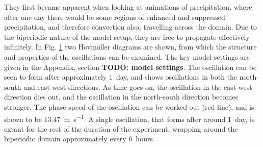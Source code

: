 \documentclass[11pt,a4paper]{article}
\newcommand\todo[1]{\textbf{TODO: #1}}
\begin{document}
They first became apparent when looking at animations of precipitation, where after one day there would be some regions of enhanced and suppressed precipitation, and therefore convection also, travelling across the domain. Due to the biperiodic nature of the model setup, they are free to propagate effectively infinitely. In Fig. \ref{fig:hovmollers} two Hovm{\"o}ller diagrams are shown, from which the structure and properties of the oscillations can be examined. The key model settings are given in the Appendix, section \todo{model settings}. The oscillation can be seen to form after approximately \SI{1}{day}, and shows oscillations in both the north-south and east-west directions. As time goes on, the oscillation in the east-west direction dies out, and the oscillation in the north-south direction becomes stronger. The phase speed of the oscillation can be worked out (red line), and is shown to be \SI{13.47}{m.s^{-1}}. A single oscillation, that forms after around \SI{1}{day}, is extant for the rest of the duration of the experiment, wrapping around the biperiodic domain approximately every \SI{6}{hours}.

\begin{figure}[hbp!]%
    \centering
    \qquad
    \caption{}%
    \label{fig:hovmollers}%
\end{figure}
\end{document}
